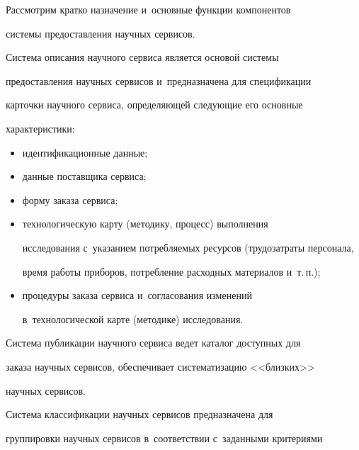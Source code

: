      Рассмотрим кратко назначение и~основные функции компонентов 


системы предоставления научных сервисов.


     


     Система описания научного сервиса является основой системы 


предоставления научных сервисов и~предназначена для спецификации 


карточки научного сервиса, определяющей следующие его основные 


характеристики:


     \begin{itemize}


     \item  идентификационные данные;\\[-13.5pt]


     \item данные поставщика сервиса;\\[-13.5pt]


     \item форму заказа сервиса;\\[-13.5pt]


     \item технологическую карту (методику, процесс) выполнения 


исследования с~указанием потребляемых ресурсов (трудозатраты персонала, 


время работы приборов, потребление расходных материалов и~т.\,п.);\\[-13.5pt]


     \item процедуры заказа сервиса и~согласования изменений 


в~технологической карте (методике) исследования.


     \end{itemize}


     


     Система публикации научного сервиса ведет каталог доступных для 


заказа научных сервисов, обеспечивает систематизацию <<близких>> 


научных сервисов.


     


     Система классификации научных сервисов предназначена для 


группировки научных сервисов в~соответствии с~заданными критериями 


